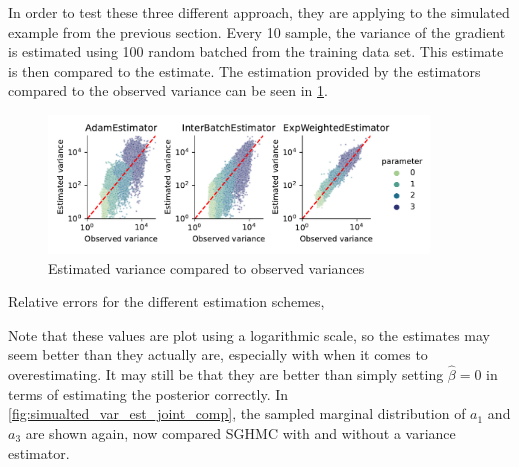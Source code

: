 In order to test these three different approach, they are applying to the simulated example from the previous section. Every 10 sample, the variance of the gradient is estimated using 100 random batched from the training data set. This estimate is then compared to the estimate. The estimation provided by the estimators compared to the observed variance can be seen in \cref{fig:est_variances_simulated}.
\begin{figure}[htbp]
    \centering
    \includegraphics[width=0.9\textwidth]{Figures/simulated_sghmc_gradient_variance_estimations.pdf}
    \caption{Estimated variance compared to observed variances}
    \label{fig:est_variances_simulated}
\end{figure}
\begin{table}[htbp]
    \centering
    
    \caption{Relative errors for the different estimation schemes,}
\end{table}
Note that these values are plot using a logarithmic scale, so the estimates may seem better than they actually are, especially with when it comes to overestimating. 
It may still be that they are better than simply setting $\hat\beta=0$ in terms of estimating the posterior correctly. In \cref{fig:simualted_var_est_joint_comp}, the sampled marginal distribution of $a_1$ and $a_3$ are shown again, now compared SGHMC with and without a variance estimator.
